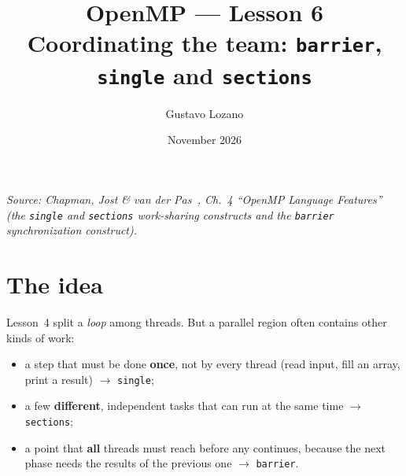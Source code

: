 \documentclass[11pt,a4paper]{article}
\title{\textbf{OpenMP --- Lesson 6}\\[4pt]\large Coordinating the team: \texttt{barrier}, \texttt{single} and \texttt{sections}}
\author{Gustavo Lozano}
\date{November 2026}
\begin{document}
\maketitle

\noindent\textit{\small Source: Chapman, Jost \& van der Pas~\cite{chapman}, Ch.~4
``OpenMP Language Features'' (the \texttt{single} and \texttt{sections} work-sharing
constructs and the \texttt{barrier} synchronization construct).}

\section{The idea}
Lesson~4 split a \emph{loop} among threads. But a parallel region often contains other
kinds of work:
\begin{itemize}
  \item a step that must be done \textbf{once}, not by every thread (read input, fill an
        array, print a result) $\to$ \texttt{single};
  \item a few \textbf{different}, independent tasks that can run at the same time
        $\to$ \texttt{sections};
  \item a point that \textbf{all} threads must reach before any continues, because the
        next phase needs the results of the previous one $\to$ \texttt{barrier}.
\end{itemize}

\begin{center}
\end{center}
\end{document}
